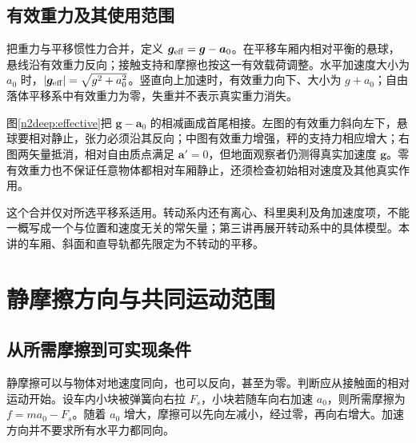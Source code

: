 \subsection{有效重力及其使用范围}
把重力与平移惯性力合并，定义 $\bm g_{\rm eff}=\bm g-\bm a_0$。在平移车厢内相对平衡的悬球，悬线沿有效重力反向；接触支持和摩擦也按这一有效载荷调整。水平加速度大小为 $a_0$ 时，$|\bm g_{\rm eff}|=\sqrt{g^2+a_0^2}$。竖直向上加速时，有效重力向下、大小为 $g+a_0$；自由落体平移系中有效重力为零，失重并不表示真实重力消失。

图\ref{n2deep:effective}把 $\bm g-\bm a_0$ 的相减画成首尾相接。左图的有效重力斜向左下，悬球要相对静止，张力必须沿其反向；中图有效重力增强，秤的支持力相应增大；右图两矢量抵消，相对自由质点满足 $\bm a'=0$，但地面观察者仍测得真实加速度 $\bm g$。零有效重力也不保证任意物体都相对车厢静止，还须检查初始相对速度及其他真实作用。

这个合并仅对所选平移系适用。转动系内还有离心、科里奥利及角加速度项，不能一概写成一个与位置和速度无关的常矢量；第三讲再展开转动系中的具体模型。本讲的车厢、斜面和直导轨都先限定为不转动的平移。

\section{静摩擦方向与共同运动范围}
\subsection{从所需摩擦到可实现条件}
静摩擦可以与物体对地速度同向，也可以反向，甚至为零。判断应从接触面的相对运动开始。设车内小块被弹簧向右拉 $F_s$，小块若随车向右加速 $a_0$，则所需摩擦为 $f=ma_0-F_s$。随着 $a_0$ 增大，摩擦可以先向左减小，经过零，再向右增大。加速方向并不要求所有水平力都同向。

